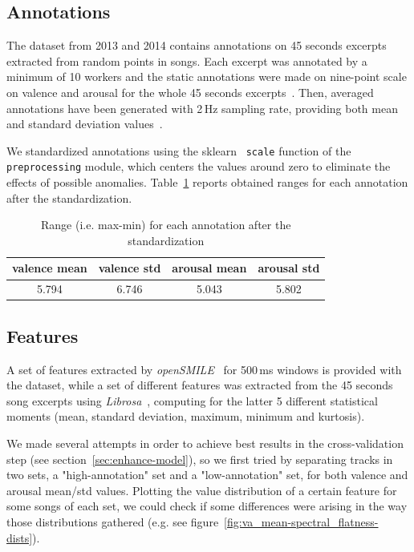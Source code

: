 \subsection{Annotations}\label{sec:annotations}

The dataset from 2013 and 2014 contains annotations on 45 seconds excerpts extracted from random points in songs. Each excerpt was annotated by a minimum of 10 workers and the static annotations were made on nine-point scale on valence and arousal for the whole 45 seconds excerpts~\cite{aljanaki2017developing}.
Then, averaged annotations have been generated with 2\,Hz sampling rate, providing both mean and standard deviation values~\cite{soleymani2016deam}.

We standardized annotations using the sklearn~\cite{scikit-learn} \texttt{scale} function of the \texttt{preprocessing} module, which centers the values around zero to eliminate the effects of possible anomalies. Table~\ref{table:annot-ranges} reports obtained ranges for each annotation after the standardization.

\begin{table}[h]
	\centering
	\begin{tabular}{cccc}
		\toprule
		valence mean & valence std & arousal mean & arousal std \\
		\midrule
		5.794 & 6.746 & 5.043 & 5.802 \\
		\bottomrule
	\end{tabular}
	\caption{Range (i.e. max-min) for each annotation after the standardization}
	\label{table:annot-ranges}
\end{table}


\subsection{Features}\label{sec:features}

A set of features extracted by \emph{openSMILE}~\cite{opensmile} for 500\,ms windows is provided with the dataset, while a set of different features was extracted from the 45 seconds song excerpts using \emph{Librosa}~\cite{librosa}, computing for the latter 5 different statistical moments (mean, standard deviation, maximum, minimum and kurtosis).

We made several attempts in order to achieve best results in the cross-validation step (see section~\ref{sec:enhance-model}), so we first tried by separating tracks in two sets, a "high-annotation" set and a "low-annotation" set, for both valence and arousal mean/std values. Plotting the value distribution of a certain feature for some songs of each set, we could check if some differences were arising in the way those distributions gathered (e.g. see figure~\ref{fig:va_mean-spectral_flatness-dists}).


